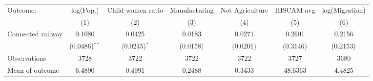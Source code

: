 \begin{tabular}{lcccccc}
  \toprule
  Outcome: & log(Pop.) & Child-women ratio & Manufacturing & Not Agriculture & HISCAM avg & log(Migration) \\
           & (1) & (2) & (3) & (4) & (5) & (6) \\
  \midrule
  Connected railway &  0.1080 & 0.0425 & 0.0183 & 0.0271 & 0.2601 & 0.2156  \\
                    &  (0.0486)$^{**}$ & (0.0245)$^{*}$ & (0.0158)$^{}$ & (0.0201)$^{}$ & (0.3146)$^{}$ & (0.2153)$^{}$  \\
  \cmidrule(lr){2-7}
  Observations      &  3728 & 3722 & 3722 & 3722 & 3727 & 3680  \\
  Mean of outcome   &  6.4890 & 0.4991 & 0.2488 & 0.3433 & 48.6363 & 4.4825  \\
  \bottomrule
\end{tabular}

